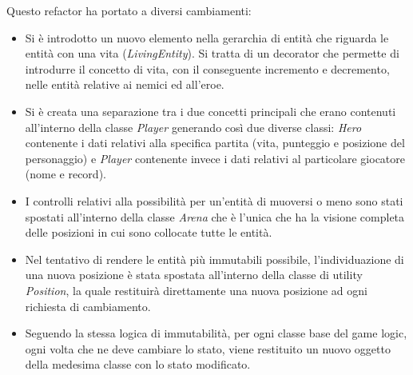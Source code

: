 Questo refactor ha portato a diversi cambiamenti:
\begin{itemize}
    \item Si è introdotto un nuovo elemento nella gerarchia di entità che riguarda le entità con una vita (\textit{LivingEntity}). Si tratta di un decorator che permette di introdurre il concetto di vita, con il conseguente incremento e decremento, nelle entità relative ai nemici ed all'eroe.
    \item Si è creata una separazione tra i due concetti principali che erano contenuti all'interno della classe \textit{Player} generando così due diverse classi: \textit{Hero} contenente i dati relativi alla specifica partita (vita, punteggio e posizione del personaggio) e \textit{Player} contenente invece i dati relativi al particolare giocatore (nome e record).
    \item I controlli relativi alla possibilità per un'entità di muoversi o meno sono stati spostati all'interno della classe \textit{Arena} che è l'unica che ha la visione completa delle posizioni in cui sono collocate tutte le entità.
    \item Nel tentativo di rendere le entità più immutabili possibile, l'individuazione di una nuova posizione è stata spostata all'interno della classe di utility \textit{Position}, la quale restituirà direttamente una nuova posizione ad ogni richiesta di cambiamento.
    \item Seguendo la stessa logica di immutabilità, per ogni classe base del game logic, ogni volta che ne deve cambiare lo stato, viene restituito un nuovo oggetto della medesima classe con lo stato modificato.
\end{itemize}
